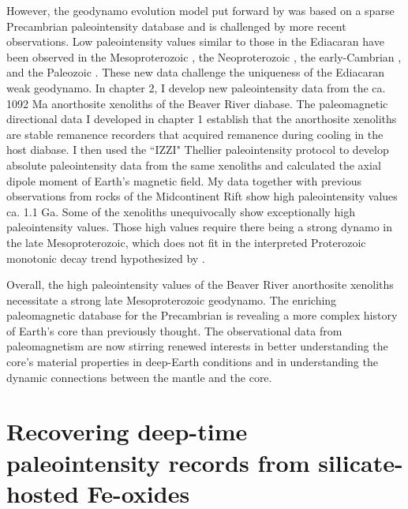 However, the geodynamo evolution model put forward by \citep{Bono2019a} was based on a sparse Precambrian paleointensity database and is challenged by more recent observations. Low paleointensity values similar to those in the Ediacaran have been observed in the Mesoproterozoic \citep{Lloyd2021b, Shcherbakova2022a, Shcherbakova2023a}, the Neoproterozoic \citep{Lloyd2021a}, the early-Cambrian \citep{Lloyd2022a}, and the Paleozoic \citep{Shcherbakova2021a}. These new data challenge the uniqueness of the Ediacaran weak geodynamo. In chapter 2, I develop new paleointensity data from the ca. 1092 Ma anorthosite xenoliths of the Beaver River diabase. The paleomagnetic directional data I developed in chapter 1 establish that the anorthosite xenoliths are stable remanence recorders that acquired remanence during cooling in the host diabase. I then used the ``IZZI" Thellier paleointensity protocol \citep{Yu2004a} to develop absolute paleointensity data from the same xenoliths and calculated the axial dipole moment of Earth's magnetic field. My data together with previous observations from rocks of the Midcontinent Rift show high paleointensity values ca. 1.1 Ga. Some of the xenoliths unequivocally show exceptionally high paleointensity values. Those high values require there being a strong dynamo in the late Mesoproterozoic, which does not fit in the interpreted Proterozoic monotonic decay trend hypothesized by \cite{Bono2019a}. 

Overall, the high paleointensity values of the Beaver River anorthosite xenoliths necessitate a strong late Mesoproterozoic geodynamo. The enriching paleomagnetic database for the Precambrian is revealing a more complex history of Earth's core than previously thought. The observational data from paleomagnetism are now stirring renewed interests in better understanding the core's material properties in deep-Earth conditions and in understanding the dynamic connections between the mantle and the core. 

\section{Recovering deep-time paleointensity records from silicate-hosted Fe-oxides}

